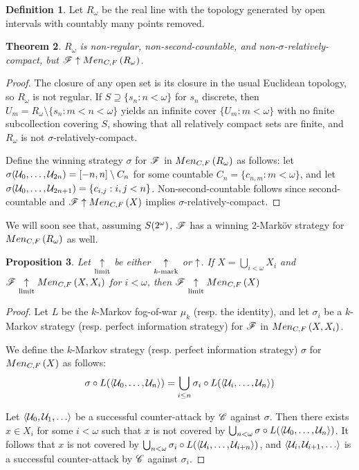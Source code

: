 \documentclass{amsart}
\newtheorem{theorem}{Theorem}[section]
\newtheorem{proposition}[theorem]{Proposition}
\theoremstyle{definition}
\newtheorem{definition}[theorem]{Definition}
\begin{document}
\begin{definition}
  Let \(R_\omega\) be the real line with the topology generated by open
  intervals with countably many points removed.
\end{definition}

\begin{theorem}
  \(R_\omega\) is non-regular, non-second-countable, and
  non-\(\sigma\)-relatively-compact, but \(\mathscr{F}\uparrow Men_{C,F}\left({R_\omega}\right)\).
\end{theorem}

\begin{proof}
  The closure of any open set is its closure in the usual Euclidean topology,
  so \(R_\omega\) is not regular. If \(S\supseteq\{s_n:n<\omega\}\) for \(s_n\)
  discrete, then \(U_m=R_\omega\setminus\{s_n:m<n<\omega\}\) yields an
  infinite cover \(\{U_m:m<\omega\}\) with no finite subcollection covering \(S\),
  showing that all relatively compact sets are finite, and \(R_\omega\) is not
  \(\sigma\)-relatively-compact.

  Define the winning strategy \(\sigma\) for \(\mathscr{F}\) in \(Men_{C,F}\left({R_\omega}\right)\) as
  follows: let \(\sigma(\mathcal{U}_0,\dots,\mathcal{U}_{2n})=[-n,n]\setminus C_n\)
  for some countable \(C_n=\{c_{n,m}: m<\omega\}\),
  and let \(\sigma(\mathcal{U}_0,\dots,\mathcal{U}_{2n+1})=\{c_{i,j} : i,j < n\}\).
  Non-second-countable follows since
  second-countable and \(\mathscr{F}\uparrow Men_{C,F}\left({X}\right)\) implies
  \(\sigma\)-relatively-compact.
\end{proof}

We will soon see that, assuming \(S(2^\omega)\), \(\mathscr{F}\) has a winning
\(2\)-Mark\"ov strategy for \(Men_{C,F}\left({R_\omega}\right)\) as well.

\begin{proposition}
  Let \(\underset{\text{limit}}{\uparrow}\) be either \(\underset{k\text{-mark}}{\uparrow}\) or \(\uparrow\).
  If \(X=\bigcup_{i<\omega} X_i\) and \(\mathscr{F} \underset{\text{limit}}{\uparrow} Men_{C,F}\left({X,X_i}\right)\)
  for \(i<\omega\), then \(\mathscr{F} \underset{\text{limit}}{\uparrow} Men_{C,F}\left({X}\right)\)
\end{proposition}

\begin{proof}
  Let \(L\) be the \(k\)-Markov fog-of-war \(\mu_k\) (resp. the identity),
  and let \(\sigma_i\) be a \(k\)-Markov strategy (resp. perfect information
  strategy) for \(\mathscr{F}\) in \(Men_{C,F}\left({X,X_i}\right)\).

  We define the \(k\)-Markov strategy (resp. perfect information strategy)
  \(\sigma\) for \(Men_{C,F}\left({X}\right)\) as follows:
    \[
      \sigma\circ L(\langle\mathcal{U}_0,\dots,\mathcal{U}_n\rangle)
        =
      \bigcup_{i\leq n}
      \sigma_i\circ L(\langle\mathcal{U}_i,\dots,\mathcal{U}_n\rangle)
    \]

  Let \(\<\mc U_0,\mc U_1,\dots\>\) be a successful counter-attack by \(\mathscr{C}\)
  against \(\sigma\). Then there exists \(x\in X_i\) for
  some \(i<\omega\) such that \(x\) is not covered by
  \(\bigcup_{n<\omega}\sigma\circ L(\langle\mathcal{U}_0,\dots,\mathcal{U}_n\rangle)\).
  It follows that \(x\) is not covered by
  \(\bigcup_{n<\omega}\sigma_i\circ L(\langle\mathcal{U}_i,\dots,\mathcal{U}_{i+n}\rangle)\),
  and \(\<\mc U_i,\mc U_{i+1},\dots\>\) is a successful counter-attack
  by \(\mathscr{C}\) against \(\sigma_i\).
\end{proof}
\end{document}
